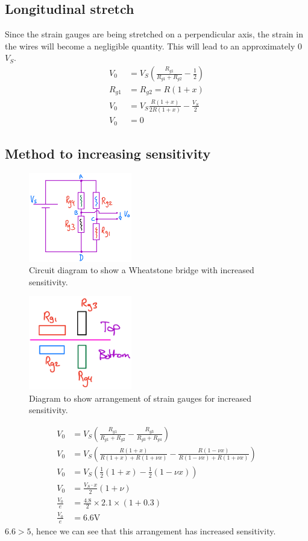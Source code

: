 \documentclass[12pt]{article}
\numberwithin{equation}{section}
\begin{document}
\subsection*{Longitudinal stretch}
Since the strain gauges are being stretched on a perpendicular axis, the strain in the wires will become a negligible quantity. This will lead to an approximately 0 $V_S$. 
\begin{align}
  V_0 &= V_S \left( \frac{R_{g1}}{R_{g1} + R_{g2}} - \frac{1}{2} \right)\\
  R_{g1} &= R_{g2} = R(1+x)\\
  V_0 &= V_S\frac{R(1+x)}{2R(1+x)} - \frac{V_S}{2}\\
  V_0 &= 0 
\end{align}
\subsection*{Method to increasing sensitivity}
\begin{figure}[H]
  \centering
  \includegraphics[width=0.4\textwidth]{./img/4-4circuit.png}
  \caption{Circuit diagram to show a Wheatstone bridge with increased sensitivity.}
\end{figure}
\begin{figure}[H]
  \centering
  \includegraphics[width=0.4\textwidth]{./img/4-4arrangement.png}
  \caption{Diagram to show arrangement of strain gauges for increased sensitivity.}
\end{figure}
\begin{align}
  V_0 &= V_S \left(\frac{R_{g1}}{R_{g1} + R_{g2}} - \frac{R_{g3}}{R_{g3} + R_{g4}}\right)\\
  V_0 &= V_S \left(\frac{R(1+x)}{R(1+x) + R(1+\nu x)} - \frac{R(1-\nu x)}{R(1-\nu x) + R(1+\nu x)}\right)\\
  V_0 &= V_S \left(\frac{1}{2}(1+x) - \frac{1}{2}(1-\nu x)\right)\\
  V_0 &= \frac{V_S \cdot x}{2} \left(1 + \nu \right)\\
  \frac{V_0}{e} &= \frac{4.8}{2} \times 2.1\times  (1 + 0.3)\\
  \frac{V_0}{e} &= 6.6 \si{\volt}
\end{align}
$6.6 > 5$, hence we can see that this arrangement has increased sensitivity.
\end{document}
